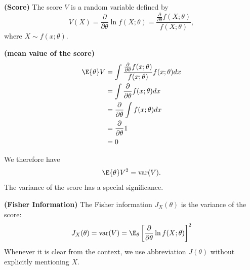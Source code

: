 \documentclass{article}
\newcommand{\bfs}[1]{\textbf{({#1})}}
\begin{document}
\begin{defa}{\bfs{Score}} The score $V$ is a random variable defined by
$$
V(X)=\frac{\partial}{\partial \theta} \ln f(X ; \theta)=\frac{\frac{\partial}{\partial \theta} f(X ; \theta)}{f(X ; \theta)},
$$
where $X \sim f(x ; \theta)$.
\end{defa}
\begin{rema}{\bfs{mean value of the score}}
$$
\begin{aligned}
\E{\theta}V &=\int \frac{\frac{\partial}{\partial \theta} f(x ; \theta)}{f(x ; \theta)} f(x ; \theta) d x \\
&=\int \frac{\partial}{\partial \theta} f(x ; \theta) d x \\
&=\frac{\partial}{\partial \theta} \int f(x ; \theta) d x \\
&=\frac{\partial}{\partial \theta} 1 \\
&=0
\end{aligned}
$$

\end{rema}
 
We therefore have $$\E{\theta}V^{2}=\operatorname{var}(V).$$ The variance of the score has a special significance.
\begin{defa}{\bfs{Fisher Information}} The Fisher information $J_X(\theta)$ is the variance of the score:
$$
J_{X}(\theta)=\operatorname{var}(V)=\E_{\theta}\left[\frac{\partial}{\partial \theta} \ln f(X ; \theta)\right]^{2}
$$
Whenever it is clear from the context, we use abbreviation $J(\theta)$ without explicitly mentioning $X$.
\end{defa}
\end{document}
